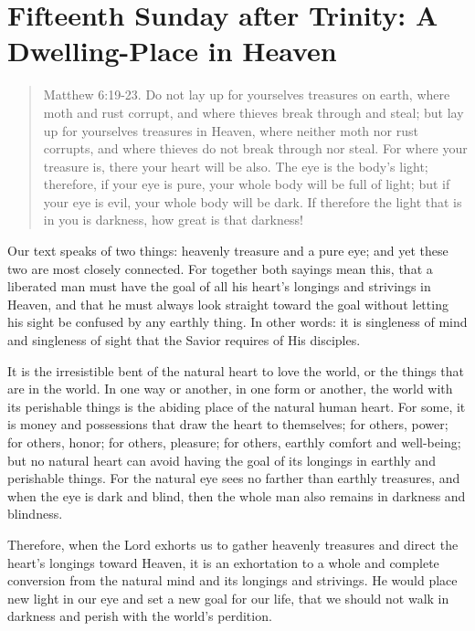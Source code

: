 


\section{Fifteenth Sunday after Trinity: A Dwelling-Place in Heaven}


\begin{quote}

Matthew 6:19-23. Do not lay up for yourselves treasures on earth, where moth and rust corrupt, and where thieves break through and steal; but lay up for yourselves treasures in Heaven, where neither moth nor rust corrupts, and where thieves do not break through nor steal. For where your treasure is, there your heart will be also. The eye is the body’s light; therefore, if your eye is pure, your whole body will be full of light; but if your eye is evil, your whole body will be dark. If therefore the light that is in you is darkness, how great is that darkness!

\end{quote}

\bigskip

Our text speaks of two things: heavenly treasure and a pure eye; and yet these two are most closely connected. For together both sayings mean this, that a liberated man must have the goal of all his heart’s longings and strivings in Heaven, and that he must always look straight toward the goal without letting his sight be confused by any earthly thing. In other words: it is singleness of mind and singleness of sight that the Savior requires of His disciples.

It is the irresistible bent of the natural heart to love the world, or the things that are in the world. In one way or another, in one form or another, the world with its perishable things is the abiding place of the natural human heart. For some, it is money and possessions that draw the heart to themselves; for others, power; for others, honor; for others, pleasure; for others, earthly comfort and well-being; but no natural heart can avoid having the goal of its longings in earthly and perishable things. For the natural eye sees no farther than earthly treasures, and when the eye is dark and blind, then the whole man also remains in darkness and blindness.

Therefore, when the Lord exhorts us to gather heavenly treasures and direct the heart’s longings toward Heaven, it is an exhortation to a whole and complete conversion from the natural mind and its longings and strivings. He would place new light in our eye and set a new goal for our life, that we should not walk in darkness and perish with the world’s perdition.

